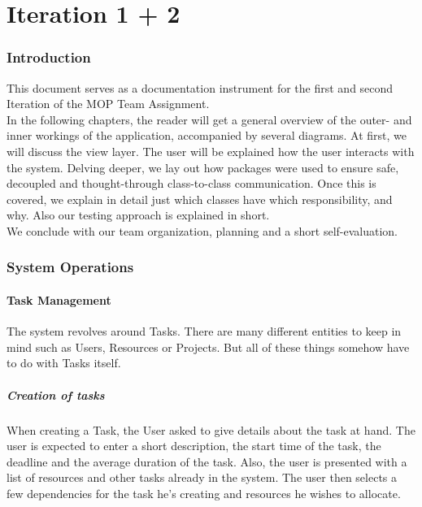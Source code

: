 



\maakvoorblad

\newpage
\thispagestyle{empty}
\mbox{}

\newpage
\maakvoorblad

\newpage

\tableofcontents

\newpage
\part{Iteration 1 + 2}
\section{Introduction}
		This document serves as a documentation instrument for the first and second Iteration of the MOP Team Assignment.\\
		In the following chapters, the reader will get a general overview of the outer- and inner workings of the application, accompanied by several diagrams. At first, we will discuss the view layer. The user will be explained how the user interacts with the system. Delving deeper, we lay out how packages were used to ensure safe, decoupled and thought-through class-to-class communication.
		Once this is covered, we explain in detail just which classes have which responsibility, and why. Also our testing approach is explained in short.\\
		We conclude with our team organization, planning and a short self-evaluation.

	\section{System Operations}
		\subsection{Task Management}
			The system revolves around Tasks. There are many different entities to keep in mind such as Users, Resources or Projects.
			But all of these things somehow have to do with Tasks itself.
			\subsubsection{Creation of tasks}
				When creating a Task, the User asked to give details about the task at hand. The user is expected to enter a short description, the start time of the task, the deadline and the average duration of the task.
				Also, the user is presented with a list of resources and other tasks already in the system. The user then selects a few dependencies for the task he's creating and resources he wishes to allocate.

